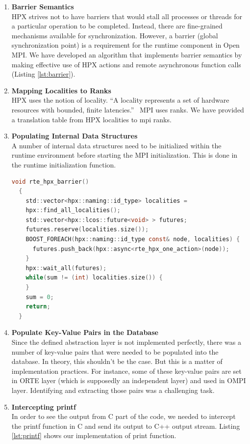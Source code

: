 \begin{enumerate}
\item \textbf{Barrier Semantics}\\
  HPX strives not to have barriers that would stall all processes or threads for a particular operation to be completed. Instead, there are fine-grained mechanisms available for synchronization. However, a barrier (global synchronization point) is a requirement for the runtime component in Open MPI. We have developed an algorithm that implements barrier semantics by making effective use of HPX actions and remote asynchronous function calls (Listing \ref{lst:barrier}).
\item \textbf{Mapping Localities to Ranks}\\
  HPX uses the notion of locality. ``A locality represents a set of hardware resources with bounded, finite latencies.''~\cite{kaiser2014hpx} MPI uses ranks. We have provided a translation table from HPX localities to mpi ranks.
\item \textbf{Populating Internal Data Structures}\\
  A number of internal data structures need to be initialized within the runtime environment before starting the MPI initialization. This is done in the runtime initialization function.

  \begin{lstlisting}[language=C, frame=single, basicstyle=\footnotesize, caption=Barrier Implementation\label{lst:barrier}]
  void rte_hpx_barrier()
  {
    std::vector<hpx::naming::id_type> localities =
    hpx::find_all_localities();
    std::vector<hpx::lcos::future<void> > futures;
    futures.reserve(localities.size());
    BOOST_FOREACH(hpx::naming::id_type const& node, localities) {
      futures.push_back(hpx::async<rte_hpx_one_action>(node));
    }
    hpx::wait_all(futures);
    while(sum != (int) localities.size()) {
    }
    sum = 0;
    return;
  }
  \end{lstlisting}
  
\item \textbf{Populate Key-Value Pairs in the Database}\\
  Since the defined abstraction layer is not implemented perfectly, there was a number of key-value pairs that were needed to be populated into the database. In theory, this shouldn't be the case. But this is a matter of implementation practices. For instance, some of these key-value pairs are set in ORTE layer (which is supposedly an independent layer) and used in OMPI layer. Identifying and extracting those pairs was a challenging task.
\item \textbf{Intercepting printf}\\
  In order to see the output from C part of the code, we needed to intercept the printf function in C and send its output to C++ output stream. Listing \ref{lst:printf} shows our implementation of print function.


\end{enumerate}
